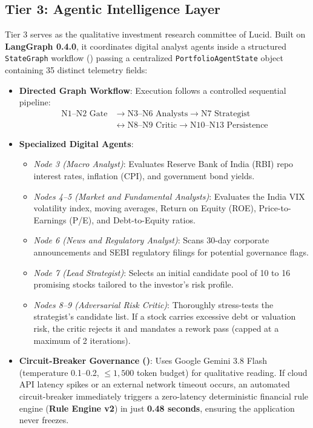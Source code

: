 \subsection{Tier 3: Agentic Intelligence Layer}
Tier 3 serves as the qualitative investment research committee of Lucid. Built on \textbf{LangGraph 0.4.0}, it coordinates digital analyst agents inside a structured \texttt{StateGraph} workflow () passing a centralized \texttt{PortfolioAgentState} object containing 35 distinct telemetry fields:
\begin{itemize}
    \item \textbf{Directed Graph Workflow}: Execution follows a controlled sequential pipeline:
    \begin{equation}
    \begin{aligned}
        \text{N1--N2 Gate} &\longrightarrow \text{N3--N6 Analysts} \longrightarrow \text{N7 Strategist} \\
        &\longleftrightarrow \text{N8--N9 Critic} \longrightarrow \text{N10--N13 Persistence}
    \end{aligned}
    \end{equation}
    \item \textbf{Specialized Digital Agents}:
    \begin{itemize}
        \item \textit{Node 3 (Macro Analyst)}: Evaluates Reserve Bank of India (RBI) repo interest rates, inflation (CPI), and government bond yields.
        \item \textit{Nodes 4--5 (Market and Fundamental Analysts)}: Evaluates the India VIX volatility index, moving averages, Return on Equity (ROE), Price-to-Earnings (P/E), and Debt-to-Equity ratios.
        \item \textit{Node 6 (News and Regulatory Analyst)}: Scans 30-day corporate announcements and SEBI regulatory filings for potential governance flags.
        \item \textit{Node 7 (Lead Strategist)}: Selects an initial candidate pool of 10 to 16 promising stocks tailored to the investor's risk profile.
        \item \textit{Nodes 8--9 (Adversarial Risk Critic)}: Thoroughly stress-tests the strategist's candidate list. If a stock carries excessive debt or valuation risk, the critic rejects it and mandates a rework pass (capped at a maximum of 2 iterations).
    \end{itemize}
    \item \textbf{Circuit-Breaker Governance ()}: Uses Google Gemini 3.8 Flash (temperature 0.1--0.2, $\le 1,500$ token budget) for qualitative reading. If cloud API latency spikes or an external network timeout occurs, an automated circuit-breaker immediately triggers a zero-latency deterministic financial rule engine (\textbf{Rule Engine v2}) in just \textbf{0.48 seconds}, ensuring the application never freezes.

\end{itemize}
